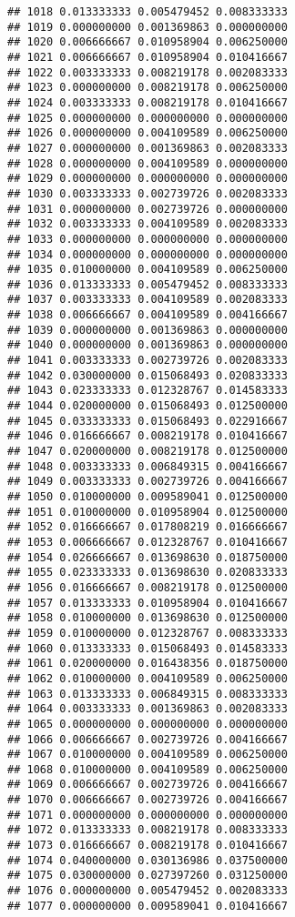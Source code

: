 \documentclass[
]{article}
\begin{document}
\begin{verbatim}
## 1018 0.013333333 0.005479452 0.008333333
## 1019 0.000000000 0.001369863 0.000000000
## 1020 0.006666667 0.010958904 0.006250000
## 1021 0.006666667 0.010958904 0.010416667
## 1022 0.003333333 0.008219178 0.002083333
## 1023 0.000000000 0.008219178 0.006250000
## 1024 0.003333333 0.008219178 0.010416667
## 1025 0.000000000 0.000000000 0.000000000
## 1026 0.000000000 0.004109589 0.006250000
## 1027 0.000000000 0.001369863 0.002083333
## 1028 0.000000000 0.004109589 0.000000000
## 1029 0.000000000 0.000000000 0.000000000
## 1030 0.003333333 0.002739726 0.002083333
## 1031 0.000000000 0.002739726 0.000000000
## 1032 0.003333333 0.004109589 0.002083333
## 1033 0.000000000 0.000000000 0.000000000
## 1034 0.000000000 0.000000000 0.000000000
## 1035 0.010000000 0.004109589 0.006250000
## 1036 0.013333333 0.005479452 0.008333333
## 1037 0.003333333 0.004109589 0.002083333
## 1038 0.006666667 0.004109589 0.004166667
## 1039 0.000000000 0.001369863 0.000000000
## 1040 0.000000000 0.001369863 0.000000000
## 1041 0.003333333 0.002739726 0.002083333
## 1042 0.030000000 0.015068493 0.020833333
## 1043 0.023333333 0.012328767 0.014583333
## 1044 0.020000000 0.015068493 0.012500000
## 1045 0.033333333 0.015068493 0.022916667
## 1046 0.016666667 0.008219178 0.010416667
## 1047 0.020000000 0.008219178 0.012500000
## 1048 0.003333333 0.006849315 0.004166667
## 1049 0.003333333 0.002739726 0.004166667
## 1050 0.010000000 0.009589041 0.012500000
## 1051 0.010000000 0.010958904 0.012500000
## 1052 0.016666667 0.017808219 0.016666667
## 1053 0.006666667 0.012328767 0.010416667
## 1054 0.026666667 0.013698630 0.018750000
## 1055 0.023333333 0.013698630 0.020833333
## 1056 0.016666667 0.008219178 0.012500000
## 1057 0.013333333 0.010958904 0.010416667
## 1058 0.010000000 0.013698630 0.012500000
## 1059 0.010000000 0.012328767 0.008333333
## 1060 0.013333333 0.015068493 0.014583333
## 1061 0.020000000 0.016438356 0.018750000
## 1062 0.010000000 0.004109589 0.006250000
## 1063 0.013333333 0.006849315 0.008333333
## 1064 0.003333333 0.001369863 0.002083333
## 1065 0.000000000 0.000000000 0.000000000
## 1066 0.006666667 0.002739726 0.004166667
## 1067 0.010000000 0.004109589 0.006250000
## 1068 0.010000000 0.004109589 0.006250000
## 1069 0.006666667 0.002739726 0.004166667
## 1070 0.006666667 0.002739726 0.004166667
## 1071 0.000000000 0.000000000 0.000000000
## 1072 0.013333333 0.008219178 0.008333333
## 1073 0.016666667 0.008219178 0.010416667
## 1074 0.040000000 0.030136986 0.037500000
## 1075 0.030000000 0.027397260 0.031250000
## 1076 0.000000000 0.005479452 0.002083333
## 1077 0.000000000 0.009589041 0.010416667

\end{verbatim}
\end{document}
